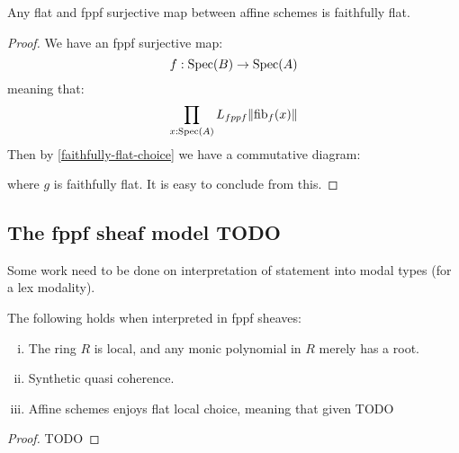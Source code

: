 \begin{proposition}
Any flat and fppf surjective map between affine schemes is faithfully flat.
\end{proposition}

\begin{proof}
We have an fppf surjective map:
\[f:\operatorname{Spec}(B)\to \operatorname{Spec}(A)\]
meaning that:
\[\prod_{x:\operatorname{Spec}(A)}L_{fppf}\lVert \mathrm{fib}_f(x) \rVert\]
Then by \cref{faithfully-flat-choice} we have a commutative diagram:
 \begin{center}
    \end{center}
where $g$ is faithfully flat. It is easy to conclude from this.
\end{proof}

\subsection{The fppf sheaf model TODO}

Some work need to be done on interpretation of statement into modal types (for a lex modality).

\begin{theorem}
The following holds when interpreted in fppf sheaves:
\begin{enumerate}[(i)]
\item The ring $R$ is local, and any monic polynomial in $R$ merely has a root.
\item Synthetic quasi coherence.
\item Affine schemes enjoys flat local choice, meaning that given TODO
\end{enumerate}
\end{theorem}

\begin{proof}
TODO
\end{proof}


